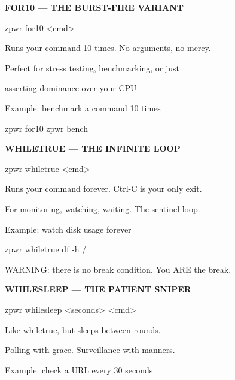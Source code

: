 \documentclass[11pt,a4paper,twoside]{book}
\begin{document}
\vspace{12pt}
{\bfseries\color{neonyellow} FOR10 — THE BURST-FIRE VARIANT}\vspace{4pt}

\begin{codebox}
zpwr for10 <cmd>\\
\end{codebox}

Runs your command 10 times. No arguments, no mercy.

Perfect for stress testing, benchmarking, or just

asserting dominance over your CPU.

Example: benchmark a command 10 times

\begin{codebox}
zpwr for10 zpwr bench\\
\end{codebox}


\vspace{12pt}
{\bfseries\color{neonyellow} WHILETRUE — THE INFINITE LOOP}\vspace{4pt}

\begin{codebox}
zpwr whiletrue <cmd>\\
\end{codebox}

Runs your command forever. Ctrl-C is your only exit.

For monitoring, watching, waiting. The sentinel loop.

Example: watch disk usage forever

\begin{codebox}
zpwr whiletrue df -h /\\
\end{codebox}

WARNING: there is no break condition. You ARE the break.


\vspace{12pt}
{\bfseries\color{neonyellow} WHILESLEEP — THE PATIENT SNIPER}\vspace{4pt}

\begin{codebox}
zpwr whilesleep <seconds> <cmd>\\
\end{codebox}

Like whiletrue, but sleeps between rounds.

Polling with grace. Surveillance with manners.

Example: check a URL every 30 seconds
\end{document}
